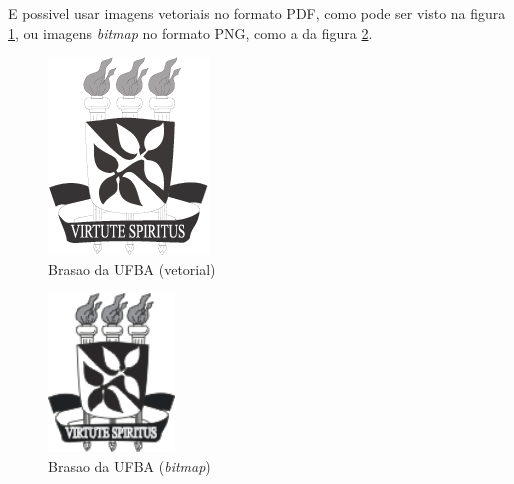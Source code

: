 E possivel usar imagens vetoriais no \cite{andrade2006} formato PDF, como pode ser visto
na figura \ref{fig:ufba}, ou imagens \emph{bitmap} no formato PNG, como
a da figura \ref{fig:ufba2}.

\begin{figure}
\centering
\includegraphics{brasaoUFBA2}
\caption{Brasao da UFBA (vetorial)}
\label{fig:ufba}
\end{figure}

\begin{figure}
\centering
\includegraphics[width=0.3\textwidth]{brasaoUFBA}
\caption{Brasao da UFBA (\emph{bitmap})}
\label{fig:ufba2}
\end{figure}

